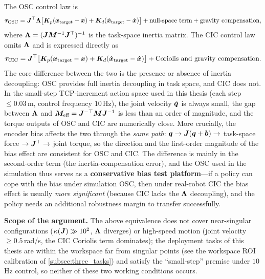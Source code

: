 The OSC control law is
\begin{equation*}
  \bm{\tau}_\text{OSC} = \bm{J}^\top \bm{\Lambda} \big[\bm{K}_p (\bm{x}_\text{target} - \bm{x}) + \bm{K}_d (\dot{\bm{x}}_\text{target} - \dot{\bm{x}})\big] + \text{null-space term} + \text{gravity compensation},
\end{equation*}
where $\bm{\Lambda} = (\bm{J}\bm{M}^{-1}\bm{J}^\top)^{-1}$ is the task-space inertia matrix. The CIC control law omits $\bm{\Lambda}$ and is expressed directly as
\begin{equation*}
  \bm{\tau}_\text{CIC} = \bm{J}^\top \big[\bm{K}_p (\bm{x}_\text{target} - \bm{x}) + \bm{K}_d (\dot{\bm{x}}_\text{target} - \dot{\bm{x}})\big] + \text{Coriolis and gravity compensation}.
\end{equation*}
The core difference between the two is the presence or absence of inertia decoupling: OSC provides full inertia decoupling in task space, and CIC does not. In the small-step TCP-increment action space used in this thesis (each step $\leq 0.03$\,m, control frequency $10$\,Hz), the joint velocity $\dot{\bm{q}}$ is always small, the gap between $\bm{\Lambda}$ and $\bm{M}_\text{eff} = \bm{J}^{-\top}\bm{M}\bm{J}^{-1}$ is less than an order of magnitude, and the torque outputs of OSC and CIC are numerically close. More crucially, the encoder bias affects the two through the \emph{same path}: $\bm{q} \to \bm{J}(\bm{q} + \bm{b}) \to$ task-space force $\to \bm{J}^\top \to$ joint torque, so the direction and the first-order magnitude of the bias effect are consistent for OSC and CIC. The difference is mainly in the second-order term (the inertia-compensation error), and the OSC used in the simulation thus serves as a \textbf{conservative bias test platform}---if a policy can cope with the bias under simulation OSC, then under real-robot CIC the bias effect is usually \emph{more significant} (because CIC lacks the $\bm{\Lambda}$ decoupling), and the policy needs an additional robustness margin to transfer successfully.

\textbf{Scope of the argument.} The above equivalence does not cover near-singular configurations ($\kappa(\bm{J}) \gg 10^2$, $\bm{\Lambda}$ diverges) or high-speed motion (joint velocity $\geq 0.5$\,rad/s, the CIC Coriolis term dominates); the deployment tasks of this thesis are within the workspace far from singular points (see the workspace ROI calibration of \cref{subsec:three_tasks}) and satisfy the ``small-step'' premise under $10$\,Hz control, so neither of these two working conditions occurs.

